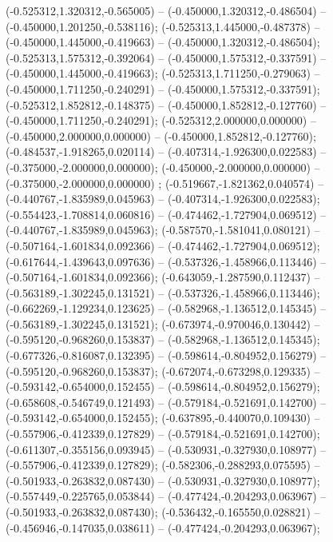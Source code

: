  (-0.525312,1.320312,-0.565005) -- (-0.450000,1.320312,-0.486504) -- (-0.450000,1.201250,-0.538116);
 (-0.525313,1.445000,-0.487378) -- (-0.450000,1.445000,-0.419663) -- (-0.450000,1.320312,-0.486504);
 (-0.525313,1.575312,-0.392064) -- (-0.450000,1.575312,-0.337591) -- (-0.450000,1.445000,-0.419663);
 (-0.525313,1.711250,-0.279063) -- (-0.450000,1.711250,-0.240291) -- (-0.450000,1.575312,-0.337591);
 (-0.525312,1.852812,-0.148375) -- (-0.450000,1.852812,-0.127760) -- (-0.450000,1.711250,-0.240291);
 (-0.525312,2.000000,0.000000) -- (-0.450000,2.000000,0.000000) -- (-0.450000,1.852812,-0.127760);
 (-0.484537,-1.918265,0.020114) -- (-0.407314,-1.926300,0.022583) -- (-0.375000,-2.000000,0.000000);
 (-0.450000,-2.000000,0.000000) -- (-0.375000,-2.000000,0.000000) ;
 (-0.519667,-1.821362,0.040574) -- (-0.440767,-1.835989,0.045963) -- (-0.407314,-1.926300,0.022583);
 (-0.554423,-1.708814,0.060816) -- (-0.474462,-1.727904,0.069512) -- (-0.440767,-1.835989,0.045963);
 (-0.587570,-1.581041,0.080121) -- (-0.507164,-1.601834,0.092366) -- (-0.474462,-1.727904,0.069512);
 (-0.617644,-1.439643,0.097636) -- (-0.537326,-1.458966,0.113446) -- (-0.507164,-1.601834,0.092366);
 (-0.643059,-1.287590,0.112437) -- (-0.563189,-1.302245,0.131521) -- (-0.537326,-1.458966,0.113446);
 (-0.662269,-1.129234,0.123625) -- (-0.582968,-1.136512,0.145345) -- (-0.563189,-1.302245,0.131521);
 (-0.673974,-0.970046,0.130442) -- (-0.595120,-0.968260,0.153837) -- (-0.582968,-1.136512,0.145345);
 (-0.677326,-0.816087,0.132395) -- (-0.598614,-0.804952,0.156279) -- (-0.595120,-0.968260,0.153837);
 (-0.672074,-0.673298,0.129335) -- (-0.593142,-0.654000,0.152455) -- (-0.598614,-0.804952,0.156279);
 (-0.658608,-0.546749,0.121493) -- (-0.579184,-0.521691,0.142700) -- (-0.593142,-0.654000,0.152455);
 (-0.637895,-0.440070,0.109430) -- (-0.557906,-0.412339,0.127829) -- (-0.579184,-0.521691,0.142700);
 (-0.611307,-0.355156,0.093945) -- (-0.530931,-0.327930,0.108977) -- (-0.557906,-0.412339,0.127829);
 (-0.582306,-0.288293,0.075595) -- (-0.501933,-0.263832,0.087430) -- (-0.530931,-0.327930,0.108977);
 (-0.557449,-0.225765,0.053844) -- (-0.477424,-0.204293,0.063967) -- (-0.501933,-0.263832,0.087430);
 (-0.536432,-0.165550,0.028821) -- (-0.456946,-0.147035,0.038611) -- (-0.477424,-0.204293,0.063967);
